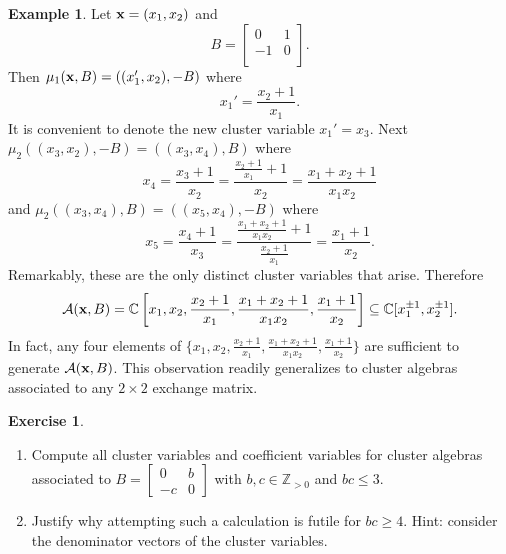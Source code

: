 \documentclass{amsart}
\theoremstyle{definition}
\newtheorem{example}[theorem]{Example}
\newtheorem{exercise}[theorem]{Exercise}
\theoremstyle{remark}
\numberwithin{equation}{section}
\newcommand{\cA}{{\mathcal{A}}}
\newcommand{\x}{{\bf x}}
\newcommand{\CC}{{\mathbb{C}}}
\newcommand{\ZZ}{{\mathbb{Z}}}
\begin{document}
	
  \begin{example}\label{example:type A2}
		Let $\x = (x_1,x_2)$ and
		\begin{displaymath}
			B = \left[ \begin{array}{cc}
			0 & 1 \\
			-1 & 0 \\
			\end{array}
			\right].
		\end{displaymath}
		Then $\mu_1(\x,B) = ((x_1',x_2), -B)$ where
		\begin{displaymath}
			x_1' = \frac{x_2+1}{x_1}.
		\end{displaymath}
		It is convenient to denote the new cluster variable $x_1'=x_3$.  Next $\mu_2((x_3,x_2),-B) = ((x_3,x_4),B)$ where
		\begin{displaymath}
			x_4 = \frac{x_3+1}{x_2} = \frac{\frac{x_2+1}{x_1}+1}{x_2} = \frac{x_1 + x_2 + 1}{x_1x_2}
		\end{displaymath}
		and  $\mu_2((x_3,x_4),B) = ((x_5,x_4),-B)$ where
		\begin{displaymath}
			x_5 = \frac{x_4+1}{x_3} = \frac{\frac{x_1 + x_2 + 1}{x_1x_2}+1}{\frac{x_2+1}{x_1}} = \frac{x_1+1}{x_2}.
		\end{displaymath}
		Remarkably, these are the only distinct cluster variables that arise.  Therefore
		\begin{displaymath}
			\cA(\x,B) = \CC\left[x_1,x_2,\frac{x_2+1}{x_1},\frac{x_1 + x_2 + 1}{x_1x_2},\frac{x_1+1}{x_2}\right] \subseteq \CC[x_1^{\pm1},x_2^{\pm1}].
		\end{displaymath}
    In fact, any four elements of $\{x_1,x_2,\frac{x_2+1}{x_1},\frac{x_1 + x_2 + 1}{x_1x_2},\frac{x_1+1}{x_2}\}$ are sufficient to generate $\cA(\x,B)$.  This observation readily generalizes to cluster algebras associated to any $2\times 2$ exchange matrix. %
  \end{example}

  \begin{exercise}\label{exercise:rank 2}\mbox{}
    \begin{enumerate}
      \item Compute all cluster variables and coefficient variables for cluster algebras associated to $B=\left[\begin{array}{cc} 0 & b\\ -c & 0\end{array}\right]$ with $b,c\in\ZZ_{>0}$ and $bc\le 3$.
      \item Justify why attempting such a calculation is futile for $bc\ge4$.  Hint: consider the denominator vectors of the cluster variables.
    \end{enumerate}
  \end{exercise}
	
\end{document}
